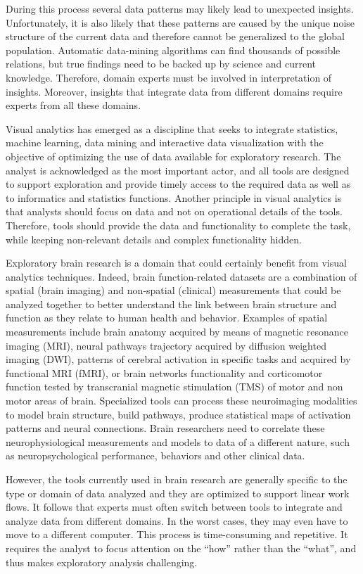 \documentclass{frontiersHLTH}
\begin{document}
During this process several data patterns may likely lead to unexpected insights. Unfortunately, it is also likely that these patterns are caused by the unique noise structure of the current data and therefore cannot be generalized to the global population. Automatic data-mining algorithms can find thousands of possible relations, but true findings need to be backed up by science and current knowledge.  Therefore, domain experts must be involved in interpretation of insights. Moreover, insights that integrate data from different domains require experts from all these domains.


Visual analytics \cite{keim_visual_2008} has emerged as a discipline that seeks to integrate statistics, machine learning, data mining and interactive data visualization with the objective of optimizing the use of data available for exploratory research. The analyst is acknowledged as the most important actor, and all tools are designed to support exploration and provide timely access to the required data as well as to informatics and statistics functions. Another principle in visual analytics is that analysts should focus on data and not on operational details of the tools. Therefore, tools should provide the data and functionality to complete the task, while keeping non-relevant details and complex functionality hidden.

Exploratory brain research is a domain that could certainly benefit from visual analytics techniques. Indeed, brain function-related datasets are a combination of spatial (brain imaging) and non-spatial (clinical) measurements that could be analyzed together to better understand the link between brain structure and function as they relate to human health and behavior. Examples of spatial measurements include brain anatomy acquired by means of magnetic resonance imaging (MRI), neural pathways trajectory acquired by diffusion weighted imaging (DWI), patterns of cerebral activation in specific tasks and acquired by functional MRI (fMRI), or brain networks functionality and corticomotor function tested by transcranial magnetic stimulation (TMS) of motor and non motor areas of brain. Specialized tools can process these neuroimaging modalities to model brain structure, build pathways, produce statistical maps of activation patterns and neural connections. Brain researchers need to correlate these neurophysiological measurements and models to data of a different nature, such as neuropsychological performance, behaviors and other clinical data.


However, the tools currently used in brain research are generally specific to the type or domain of data analyzed and they are optimized to support linear work flows. It follows that experts must often switch between tools to integrate and analyze data from different domains. In the worst cases, they may even have to move to a different computer. This process is time-consuming and repetitive. It requires the analyst to focus attention on the ``how'' rather than the ``what'', and thus makes exploratory analysis challenging.
					
\end{document}
